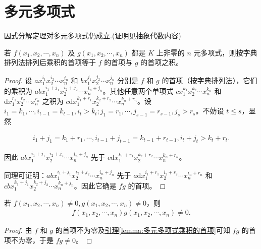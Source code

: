 \documentclass[../../main.tex]{subfiles}
\begin{document}
\section{多元多项式}

因式分解定理对多元多项式仍成立.(证明见抽象代数内容)

\begin{lemma}\label{lemma:多元多项式乘积的首项}
若 $f(x_1, x_2, \cdots, x_n)$ 及 $g(x_1, x_2, \cdots, x_n)$ 都是 $K$ 上非零的 $n$ 元多项式，则按字典排列法排列后乘积的首项等于 $f$ 的首项与 $g$ 的首项之积。
\end{lemma}
\begin{proof}
设 $ax_1^{i_1} x_2^{i_2} \cdots x_n^{i_n}$ 和 $bx_1^{j_1} x_2^{j_2} \cdots x_n^{j_n}$ 分别是 $f$ 和 $g$ 的首项（按字典排列法），它们的乘积为 $abx_1^{i_1 + j_1} x_2^{i_2 + j_2} \cdots x_n^{i_n + j_n}$。其他任意两个单项式 $cx_1^{k_1} x_2^{k_2} \cdots x_n^{k_n}$ 和 $\mathrm{d}x_1^{r_1} x_2^{r_2} \cdots x_n^{r_n}$ 之积为 $c\mathrm{d}x_1^{k_1 + r_1} x_2^{k_2 + r_2} \cdots x_n^{k_n + r_n}$。设 $i_1 = k_1, \cdots, i_{t-1} = k_{t-1}, i_t > k_t; j_1 = r_1, \cdots, j_{s-1} = r_{s-1}, j_s > r_s$。不妨设 $t \leqslant  s$，显然

\begin{align*}
i_1 + j_1 = k_1 + r_1, \cdots, i_{t-1} + j_{t-1} = k_{t-1} + r_{t-1}, i_t + j_t > k_t + r_t.
\end{align*}

因此 $abx_1^{i_1 + j_1} x_2^{i_2 + j_2} \cdots x_n^{i_n + j_n}$ 先于 $c\mathrm{d}x_1^{k_1 + r_1} x_2^{k_2 + r_2} \cdots x_n^{k_n + r_n}$。

同理可证明：$abx_1^{i_1 + j_1} x_2^{i_2 + j_2} \cdots x_n^{i_n + j_n}$ 先于 $a\mathrm{d}x_1^{i_1 + r_1} x_2^{i_2 + r_2} \cdots x_n^{i_n + r_n}$ 和 $cbx_1^{k_1 + j_1} x_2^{k_2 + j_2} \cdots x_n^{k_n + j_n}$。因此它确是 $fg$ 的首项。
\end{proof}

\begin{proposition}[多元多项式的整性]\label{proposition:多元多项式的整性}
若 $f(x_1, x_2, \cdots, x_n) \neq 0, g(x_1, x_2, \cdots, x_n) \neq 0$，则
\begin{align*}
f(x_1, x_2, \cdots, x_n)g(x_1, x_2, \cdots, x_n) \neq 0.
\end{align*}
\end{proposition}
\begin{proof}
由 $f$ 和 $g$ 的首项不为零及\hyperref[lemma:多元多项式乘积的首项]{引理\ref{lemma:多元多项式乘积的首项}}可知 $fg$ 的首项不为零，于是 $fg \neq 0$。
\end{proof}
\end{document}
